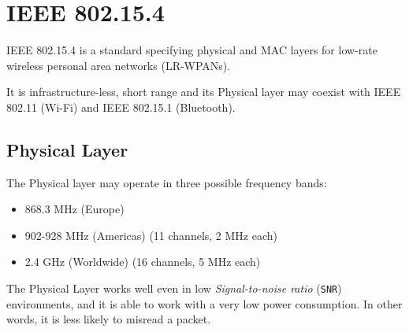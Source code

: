 
\section{IEEE 802.15.4}

IEEE 802.15.4 is a standard specifying physical and MAC layers for low-rate wireless personal area networks (LR-WPANs).

It is infrastructure-less, short range and its Physical layer may coexist with IEEE 802.11 (Wi-Fi) and IEEE 802.15.1 (Bluetooth). 

\subsection{Physical Layer}

The Physical layer may operate in three possible frequency bands:
\begin{itemize}
   \item 868.3 MHz (Europe)
   \item 902-928 MHz (Americas) (11 channels, 2 MHz each)
   \item 2.4 GHz (Worldwide) (16 channels, 5 MHz each)
\end{itemize}

The Physical Layer works well even in low \textit{Signal-to-noise ratio} (\texttt{SNR}) environments, and it is able to work with a very low power consumption.
In other words, it is less likely to misread a packet.


